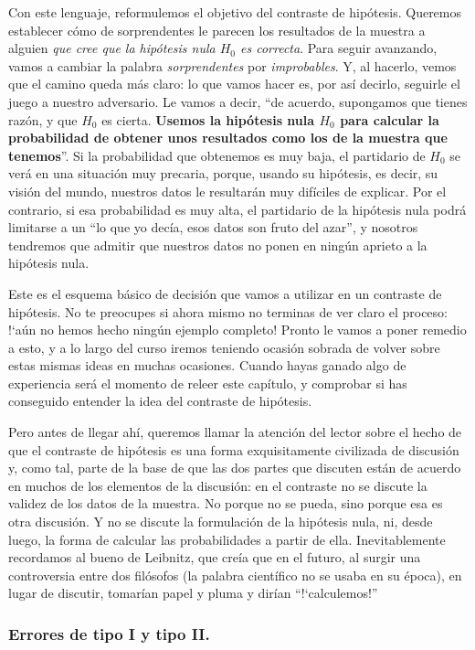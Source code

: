 Con este lenguaje, reformulemos el objetivo del contraste de hipótesis. Queremos establecer cómo de sorprendentes  le parecen los resultados de la muestra a alguien {\em que cree que la hipótesis nula $H_0$ es correcta}. Para seguir avanzando, vamos a cambiar la palabra {\em sorprendentes} por {\em improbables}. Y, al hacerlo, vemos que el camino queda más claro: lo que vamos hacer es, por así decirlo, seguirle el juego a nuestro adversario. Le vamos a decir, ``de acuerdo, supongamos que tienes razón, y que $H_0$ es cierta. {\bf Usemos la hipótesis nula $H_0$ para calcular la probabilidad de obtener unos resultados como los de la muestra que tenemos}''. Si la probabilidad que obtenemos es muy baja, el partidario de $H_0$ se verá en una situación muy precaria, porque, usando su hipótesis, es decir, su visión del mundo, nuestros datos le resultarán muy difíciles de explicar. Por el contrario, si esa probabilidad es muy alta, el partidario de la hipótesis nula podrá limitarse a un ``lo que yo decía, esos datos son fruto del azar'', y nosotros tendremos que admitir que nuestros datos no ponen en ningún aprieto a la hipótesis nula.

Este es el esquema básico de decisión que vamos a utilizar en un contraste de hipótesis. No te preocupes si ahora mismo no terminas de ver claro el proceso: {!`}aún no hemos hecho ningún ejemplo completo! Pronto le vamos a poner remedio a esto, y a lo largo del curso iremos teniendo ocasión sobrada de volver sobre estas mismas ideas en muchas ocasiones. Cuando hayas ganado algo de experiencia será el momento de releer este capítulo, y comprobar si has conseguido entender la idea del contraste de hipótesis.

Pero antes de llegar ahí, queremos llamar la atención del lector sobre el hecho de que el contraste de hipótesis es una forma exquisitamente civilizada de discusión y, como tal, parte de la base de que las dos partes que discuten están de acuerdo en muchos de los elementos de la discusión: en el contraste no se discute la validez de los datos de la muestra. No porque no se pueda, sino porque esa es otra discusión. Y no se discute la formulación de la hipótesis nula, ni, desde luego, la forma de calcular las probabilidades a partir de ella. Inevitablemente recordamos al bueno de Leibnitz, que creía que en el futuro, al surgir una controversia entre dos filósofos (la palabra científico no se usaba en su época), en lugar de discutir, tomarían papel y pluma y dirían ``{!`}calculemos!''


\subsubsection*{Errores de tipo I y tipo II.}

